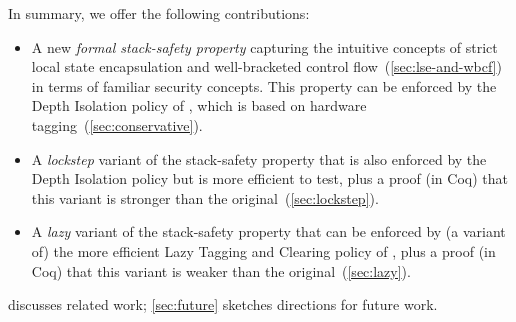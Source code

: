 \documentclass[acmsmall,review,anonymous]{acmart}\settopmatter{printfolios=true,printccs=false,printacmref=false}
\begin{document}
In summary, we offer the following contributions:
\begin{itemize}
\item
  A new {\em formal stack-safety property} capturing the
  intuitive concepts of strict local state encapsulation and well-bracketed
  control flow~(\cref{sec:lse-and-wbcf}) in terms of familiar security concepts.
  This property can be enforced by
  the Depth Isolation policy of \citet{DBLP:conf/sp/RoesslerD18}, which is
  based on hardware tagging~(\cref{sec:conservative}).
\item
  A {\em lockstep} variant of the stack-safety property that is also
  enforced by the Depth Isolation policy
  but is more efficient to test, plus a proof (in Coq) that this variant is
  stronger than the original~(\cref{sec:lockstep}).
\item
  A {\em lazy} variant of the stack-safety property that can be enforced by
  (a variant of) the
  more efficient Lazy Tagging and Clearing policy
  of \citet{DBLP:conf/sp/RoesslerD18}, plus a proof (in Coq) that this
  variant is weaker than the original~(\cref{sec:lazy}).
%

\end{itemize}
 discusses related work;
\cref{sec:future} sketches directions for future work.
\end{document}
